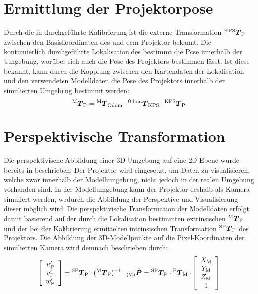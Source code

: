 \section{Ermittlung der Projektorpose}
Durch die in  durchgeführte Kalibrierung ist die externe Transformation ${^{\mathrm{KPS}}\mbox{\boldmath{$T$}}_{\mathrm{P}}}$ zwischen den Basiskoordinaten des  und dem Projektor bekannt. Die kontinuierlich durchgeführte Lokalisation des  bestimmt die Pose innerhalb der Umgebung, worüber sich auch die Pose des Projektors bestimmen lässt. Ist diese bekannt, kann durch die Kopplung zwischen den Kartendaten der Lokalisation und den verwendeten Modelldaten die Pose des Projektors innerhalb der simulierten Umgebung bestimmt werden:
%
\begin{equation}
{^{\mathrm{M}}\mbox{\boldmath{$T$}}_{\mathrm{P}}} = {^{\mathrm{M}}\mbox{\boldmath{$T$}}_{\mathrm{Odom}}} \cdot {^{\mathrm{Odom}}\mbox{\boldmath{$T$}}_{\mathrm{KPS}}} \cdot {^{\mathrm{KPS}}\mbox{\boldmath{$T$}}_{\mathrm{P}}}
\end{equation}

\section{Perspektivische Transformation}
Die perspektivische Abbildung einer 3D-Umgebung auf eine 2D-Ebene wurde bereits in  beschrieben. Der Projektor wird eingesetzt, um Daten zu visualisieren, welche zwar innerhalb der Modellumgebung, nicht jedoch in der realen Umgebung vorhanden sind. In der Modellumgebung kann der Projektor deshalb als Kamera simuliert werden, wodurch die Abbildung der Perspektive und Visualisierung dieser möglich wird. Die perspektivische Transformation der Modelldaten erfolgt damit basierend auf der durch die Lokalisation bestimmten extrinsischen ${^{\mathrm{M}}\mbox{\boldmath{$T$}}_{\mathrm{P}}}$ und der bei der Kalibrierung ermittelten intrinsischen Transformation ${^{\mathrm{SP}}\mbox{\boldmath{$T$}}_{\mathrm{P}}}$ des Projektors. Die Abbildung der 3D-Modellpunkte auf die Pixel-Koordinaten der simulierten Kamera wird demnach beschrieben durch:
%
\begin{equation}
\left[\begin{array}{c}
u_{{\mathrm{P}}}'\\
v_{{\mathrm{P}}}'\\
w_{{\mathrm{P}}}'
\end{array}\right]
= {^{\mathrm{SP}}\mbox{\boldmath{$T$}}_{\mathrm{P}}} \cdot ({^{\mathrm{M}}\mbox{\boldmath{$T$}}_{\mathrm{P}}})^{-1} \cdot {_{{\mathrm{(M)}}}}\mbox{\boldmath{$\tilde{P}$}} = {^{\mathrm{SP}}\mbox{\boldmath{$T$}}_{\mathrm{P}}} \cdot {^{\mathrm{P}}\mbox{\boldmath{$T$}}_{\mathrm{M}}} \cdot \left[\begin{array}{c}
X_{{\mathrm{M}}}\\
Y_{{\mathrm{M}}}\\
Z_{{\mathrm{M}}}\\
1
\end{array} \right]
\label{eq.proj_trans}
\end{equation}

